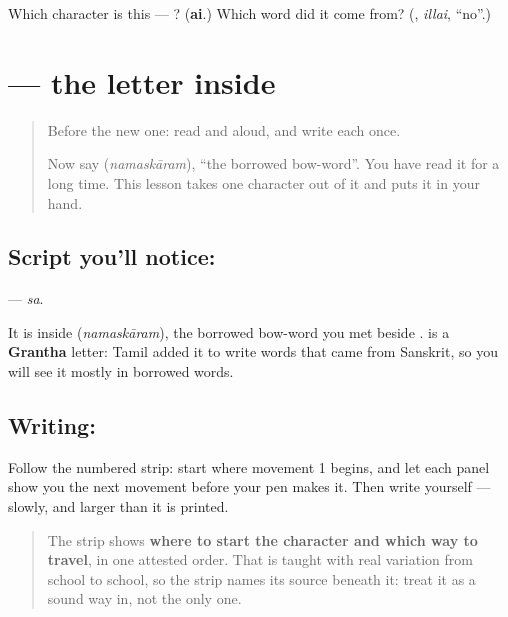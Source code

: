 \begin{tcolorbox}[breakable,colback=teal!4,colframe=teal!35!black,title={Before you move on}]
Which character is this — ? (\textbf{ai}.) Which word did it come from? (\textbf{}, \emph{illai}, \textquotedblleft{}no\textquotedblright{}.)
\end{tcolorbox}
\section[\texorpdfstring{\ta{ஸ} (sa)}{ஸ (sa)}]{ — the letter inside }

\label{lesson:TA-S129-letter-sa}



\begin{quote}
Before the new one: read  and  aloud, and write each once.

Now say \textbf{} (\emph{namaskāram}), \textquotedblleft{}the borrowed bow-word\textquotedblright{}. You have read it for a long time. This lesson takes one character out of it and puts it in your hand.
\end{quote}

\subsection*{Script you'll notice: }
\textbf{} — \emph{sa}.

It is inside \textbf{} (\emph{namaskāram}), the borrowed bow-word you met beside .  is a \textbf{Grantha} letter: Tamil added it to write words that came from Sanskrit, so you will see it mostly in borrowed words.

\subsection*{Writing: }

Follow the numbered strip: start where movement 1 begins, and let each panel show you the next movement before your pen makes it. Then write  yourself — slowly, and larger than it is printed.

\begin{quote}
The strip shows \textbf{where to start the character and which way to travel}, in one attested order. That is taught with real variation from school to school, so the strip names its source beneath it: treat it as a sound way in, not the only one.
\end{quote}


